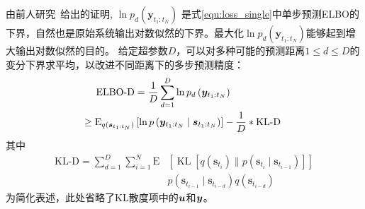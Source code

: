 由前人研究~\cite{Hafner2019}给出的证明, $\ln p_d\left(\boldsymbol{y}_{t_{1}: t_{N}}\right)$ 是式\eqref{equ:loss_single}中单步预测ELBO的下界，自然也是原始系统输出对数似然的下界。最大化$\ln p_d\left(\boldsymbol{y}_{t_{1}: t_{N}}\right)$能够起到增大输出对数似然的目的。
给定超参数$D$，可以对多种可能的预测距离$1\leq d \leq D$的变分下界求平均，以改进不同距离下的多步预测精度：
\begin{equation}
\begin{aligned}
    \text{ELBO-D}&=\frac{1}{D}\sum_{d=1}^{D}\ln p_d\left(\boldsymbol{y}_{t_{1}: t_{N}}\right) \\
     \geq\mathrm{E}_{q(\boldsymbol s_{t_1:t_N})}&\left[\ln p\left(\boldsymbol y_{t_1:t_N} \mid \boldsymbol s_{t_1:t_N}\right)\right]-\frac{1}{D}*\text{KL-D}\
\end{aligned}
\end{equation}
其中
\begin{equation}
\begin{aligned}
\text{KL-D}=\sum_{d=1}^{D}\sum_{i=1}^{N}\mathrm{E}&\left[\operatorname{KL}\left[q\left(\boldsymbol{s}_{t_{i}} \right) \| p\left(\boldsymbol{s}_{t_{i}} \mid \boldsymbol{s}_{t_{i-1}}\right)\right]\right]\\[-15pt]
&{p\left(\boldsymbol{s}_{t_{i-1}} \mid \boldsymbol{s}_{t_{i-d}}\right){q\left(\boldsymbol{s}_{t_{i-d}} \right)}}
\end{aligned}
\label{equ:kld}
\end{equation}
为简化表述，此处省略了KL散度项中的$\boldsymbol u$和$\boldsymbol y$。

